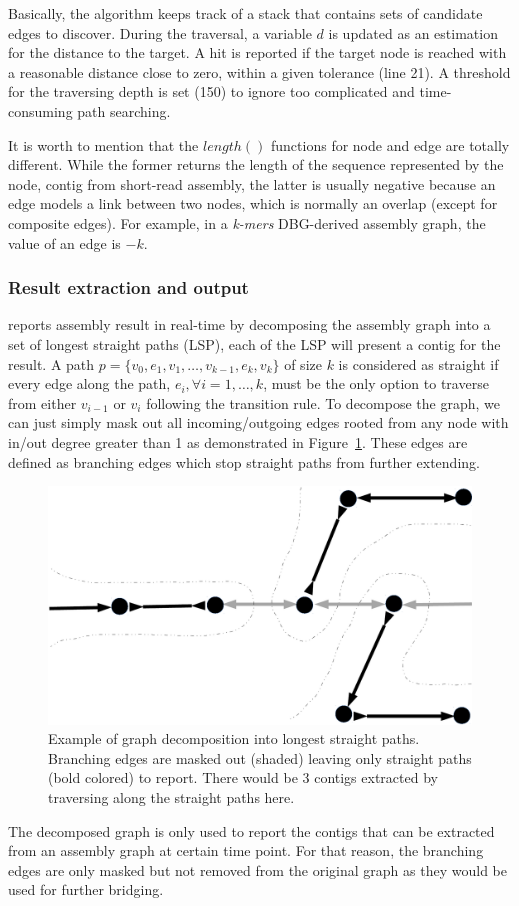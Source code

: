 Basically, the algorithm keeps track of a stack that contains sets of candidate edges to discover. During the traversal, a variable $d$ is updated as an estimation for the distance to the target. A hit is reported if the target node is reached with a reasonable distance \IE{} close to zero, within a given tolerance (line 21). 
A threshold for the traversing depth is set (150) to ignore too complicated and time-consuming path searching.

It is worth to mention that the $length()$ functions for node and edge are totally different. While the former returns the length of the sequence represented by the node, \IE{} contig from short-read assembly, the latter is usually negative because an edge models a link between two nodes, which is normally an overlap (except for composite edges). For example, in a \emph{k-mers} DBG-derived assembly graph, the value of an edge is $-k$. 

\subsubsection{Result extraction and output}
\npgraph{} reports assembly result in real-time by decomposing the assembly graph into a set of longest straight paths (LSP), each of the LSP will present a contig for the result.
A path $p=\{v_0,e_1,v_1,\ldots,v_{k-1},e_k,v_k\}$ of size $k$ is considered as straight if every edge along the path, $e_i, \forall i=1,\ldots,k$, must be the only option to traverse from either $v_{i-1}$ or $v_i$ following the transition rule.
To decompose the graph, we can just simply mask out all incoming/outgoing edges rooted from any node with in/out degree greater than 1 as demonstrated in Figure~\ref{figure:npgraph_decompose}. These edges are defined as branching edges which stop straight paths from further extending.

\begin{figure}[!hpt]
\centering
\includegraphics[width=.6\textwidth]{images/decompose.pdf}
\caption[Example of graph decomposition into longest straight paths]{Example of graph decomposition into longest straight paths. Branching edges are masked out (shaded) leaving only straight paths (bold colored) to report. There would be 3 contigs extracted by traversing along the straight paths here.}
\label{figure:npgraph_decompose}
\end{figure}
The decomposed graph is only used to report the contigs that can be extracted from an assembly graph at certain time point. For that reason, the branching edges are only masked but not removed from the original graph as they would be used for further bridging.

